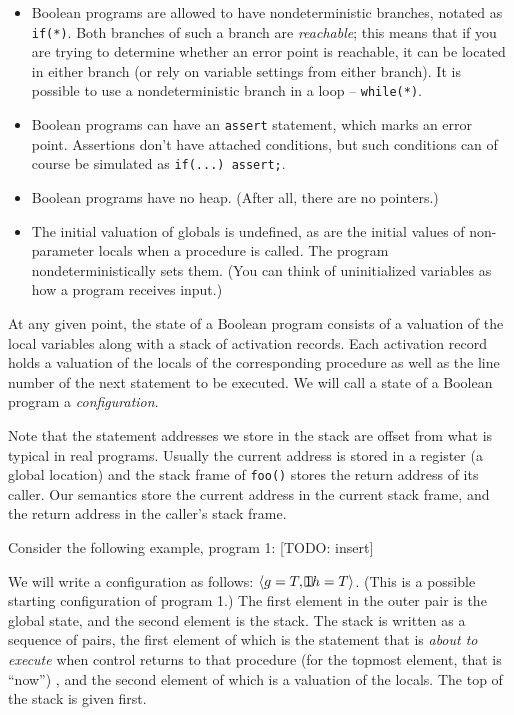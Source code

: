 \documentclass{article}
\newcommand{\Code}[1]{\texttt{#1}}
\newcommand{\Config}[2]{\ensuremath{\langle #1, #2 \rangle}}
\begin{document}
\begin{itemize}
  \item 
    Boolean programs are allowed to have nondeterministic branches,
    notated as \Code{if(*)}. Both branches of such a branch are
    \emph{reachable}; this means that if you are trying to determine
    whether an error point is reachable, it can be located in either
    branch (or rely on variable settings from either branch). It is
    possible to use a nondeterministic branch in a loop --
    \Code{while(*)}.

  \item
    Boolean programs can have an \Code{assert} statement, which marks
    an error point. Assertions don't have attached conditions, but
    such conditions can of course be simulated as \Code{if(...)
      assert;}.

  \item
    Boolean programs have no heap. (After all, there are no pointers.)

  \item
    The initial valuation of globals is undefined, as are the initial
    values of non-parameter locals when a procedure is called. The
    program nondeterministically sets them. (You can think of
    uninitialized variables as how a program receives input.)
\end{itemize}

At any given point, the state of a Boolean program consists of a
valuation of the local variables along with a stack of activation
records. Each activation record holds a valuation of the locals of the
corresponding procedure as well as the line number of the next
statement to be executed. We will call a state of a Boolean program a
\emph{configuration}.

Note that the statement addresses we store in the stack are offset
from what is typical in real programs. Usually the current address is
stored in a register (a global location) and the stack frame of
\Code{foo()} stores the return address of its caller. Our semantics
store the current address in the current stack frame, and the return
address in the caller's stack frame.

Consider the following example, program 1:
[TODO: insert]

We will write a configuration as follows:
\Config{g=T}{\frame{1}{h=T}}. (This is a possible starting
configuration of program 1.) The first element in the outer pair is
the global state, and the second element is the stack. The stack is
written as a sequence of pairs, the first element of which is the
statement that is \emph{about to execute} when control returns to that
procedure (for the topmost element, that is ``now'') , and the second
element of which is a valuation of the locals. The top of the stack is
given first.
\end{document}

